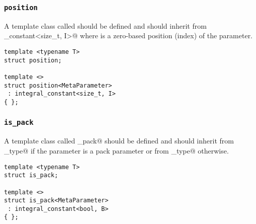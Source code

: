 \subsubsection{\texttt{position}}

A template class called \verb@position@ should be defined and should
inherit from \verb@integral_constant<size_t, I>@ where \verb@I@ is
a zero-based position (index) of the parameter.

\begin{verbatim}
template <typename T>
struct position;

template <>
struct position<MetaParameter>
 : integral_constant<size_t, I>
{ };
\end{verbatim}

\subsubsection{\texttt{is\_pack}}

A template class called \verb@is_pack@ should be defined and should
inherit from \verb@true_type@ if the parameter is a pack
parameter or from \verb@false_type@ otherwise.

\begin{verbatim}
template <typename T>
struct is_pack;

template <>
struct is_pack<MetaParameter>
 : integral_constant<bool, B>
{ };
\end{verbatim}

